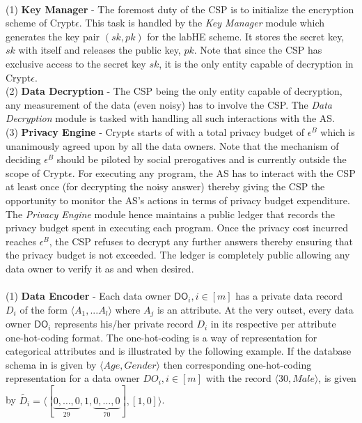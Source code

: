 \\
(1)\textbf{ Key Manager }- The foremost duty of the \textsf{CSP} is to initialize the encryption scheme of Crypt$\epsilon$. This task is handled by the \textit{Key Manager} module which generates the key pair $(sk,pk)$ for the \textsf{labHE} scheme. It stores the secret key, $sk$ with itself and releases the public key, $pk$. Note that since the \textsf{CSP} has exclusive access to the secret key $sk$, it is the only entity capable of decryption in Crypt$\epsilon$.\\
(2)\textbf{ Data Decryption }- The \textsf{CSP} being the only entity capable of decryption,  any measurement of the data (even noisy) has to involve the \textsf{CSP}. The \textit{Data Decryption} module is tasked with handling all such interactions with the \textsf{AS}. \\
(3)\textbf{ Privacy Engine }- Crypt$\epsilon$ starts of with a total privacy budget of $\epsilon^B$ which is unanimously agreed upon by all the data owners. Note that the mechanism of deciding $\epsilon^B$ should be piloted by social prerogatives \cite{e1,e2} 
and is currently outside the scope of Crypt$\epsilon$. For executing any program, the \textsf{AS} has to interact with the \textsf{CSP} at least once (for decrypting the noisy answer) thereby giving the \textsf{CSP} the opportunity to monitor the \textsf{AS}'s actions in terms of privacy budget expenditure. The \textit{Privacy Engine} module hence maintains a public ledger that records the privacy budget spent in executing each program. Once the privacy cost incurred reaches 
$\epsilon^B$, the \textsf{CSP} refuses to decrypt any further answers thereby ensuring that the privacy budget is not exceeded.  The ledger is completely public allowing any data owner to verify it as and when desired.\\
\\
(1)\textbf{ Data Encoder} -  Each data owner $\textsf{DO}_i, i \in [m]$ has a private data record $D_i$ of the form $\langle A_1,...A_l\rangle$ where ${A}_j$ is an attribute. At the very outset, every data owner  $\textsf{DO}_i$ represents his/her private record $D_i$ in its respective per attribute one-hot-coding format. The one-hot-coding is a way of representation for categorical attributes and is illustrated by the following example. 
If the database schema in \system is given by  $\langle Age,Gender\rangle$ then corresponding one-hot-coding representation for a data owner $DO_i, i \in [m]$ with the record $\langle 30, Male\rangle$, is given by $\tilde{D_i}=\langle[\underbrace{0,\ldots,0}_{29},1,\underbrace{0,\ldots,0}_{70}],[1,0]\rangle$. \\
